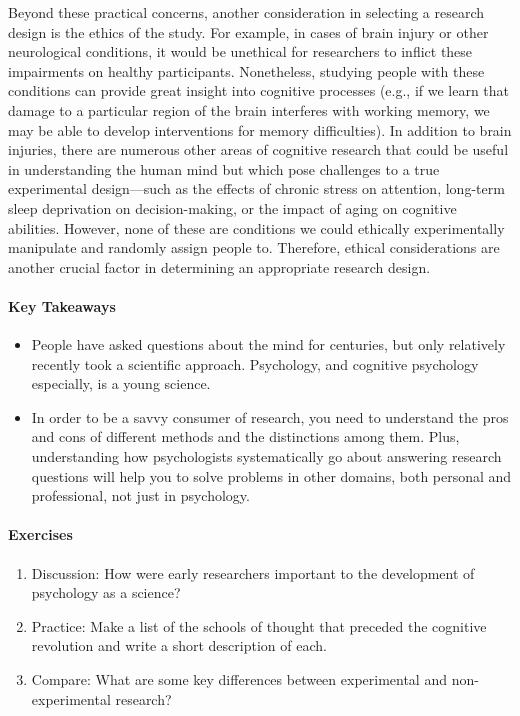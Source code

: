 \documentclass[
]{krantz}
\newcounter{none} %
\providecommand{\tightlist}{%
  \setlength{\itemsep}{0pt}\setlength{\parskip}{0pt}}
\begin{document}
Beyond these practical concerns, another consideration in selecting a research design is the ethics of the study. For example, in cases of brain injury or other neurological conditions, it would be unethical for researchers to inflict these impairments on healthy participants. Nonetheless, studying people with these conditions can provide great insight into cognitive processes (e.g., if we learn that damage to a particular region of the brain interferes with working memory, we may be able to develop interventions for memory difficulties). In addition to brain injuries, there are numerous other areas of cognitive research that could be useful in understanding the human mind but which pose challenges to a true experimental design---such as the effects of chronic stress on attention, long-term sleep deprivation on decision-making, or the impact of aging on cognitive abilities. However, none of these are conditions we could ethically experimentally manipulate and randomly assign people to. Therefore, ethical considerations are another crucial factor in determining an appropriate research design.

\paragraph*{Key Takeaways}\label{key-takeaways}

\begin{itemize}
\tightlist
\item
  People have asked questions about the mind for centuries, but only relatively recently took a scientific approach. Psychology, and cognitive psychology especially, is a young science.
\item
  In order to be a savvy consumer of research, you need to understand the pros and cons of different methods and the distinctions among them. Plus, understanding how psychologists systematically go about answering research questions will help you to solve problems in other domains, both personal and professional, not just in psychology.
\end{itemize}

\paragraph*{Exercises}\label{exercises}

\begin{enumerate}
\def\labelenumi{\arabic{enumi}.}
\tightlist
\item
  Discussion: How were early researchers important to the development of psychology as a science?
\item
  Practice: Make a list of the schools of thought that preceded the cognitive revolution and write a short description of each.
\item
  Compare: What are some key differences between experimental and non-experimental research?
\end{enumerate}
\end{document}
